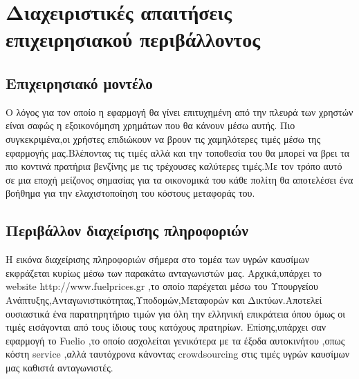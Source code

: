 \section{Διαχειριστικές απαιτήσεις επιχειρησιακού περιβάλλοντος}

\subsection{Επιχειρησιακό μοντέλο}
Ο λόγος για τον οποίο η εφαρμογή θα γίνει επιτυχημένη από την πλευρά των χρηστών είναι σαφώς η εξοικονόμηση χρημάτων που θα κάνουν μέσω αυτής.
Πιο συγκεκριμένα,οι χρήστες επιδιώκουν να βρουν τις χαμηλότερες τιμές μέσω της εφαρμογής μας.Βλέποντας τις τιμές αλλά και την τοποθεσία του θα μπορεί να βρει τα πιο κοντινά πρατήρια βενζίνης με τις τρέχουσες καλύτερες τιμές.Με τον τρόπο αυτό σε μια εποχή μείζονος σημασίας για τα οικονομικά του κάθε πολίτη θα αποτελέσει ένα βοήθημα για την ελαχιστοποίηση του κόστους μεταφοράς του.


\subsection{Περιβάλλον διαχείρισης πληροφοριών}
Η εικόνα διαχείρισης πληροφοριών σήμερα στο τομέα των υγρών καυσίμων  εκφράζεται κυρίως μέσω των παρακάτω ανταγωνιστών μας.
Αρχικά,υπάρχει το website http://www.fuelprices.gr ,το οποίο παρέχεται μέσω του Υπουργείου Ανάπτυξης,Ανταγωνιστικότητας,Υποδομών,Μεταφορών και Δικτύων.Αποτελεί ουσιαστικά ένα παρατηρητήριο τιμών για όλη την ελληνική επικράτεια όπου όμως οι τιμές εισάγονται από τους ίδιους τους κατόχους πρατηρίων.
Επίσης,υπάρχει σαν εφαρμογή το Fuelio ,το οποίο ασχολείται γενικότερα με τα έξοδα αυτοκινήτου ,οπως κόστη service ,αλλά ταυτόχρονα κάνοντας crowdsourcing στις τιμές υγρών καυσίμων μας καθιστά ανταγωνιστές.


